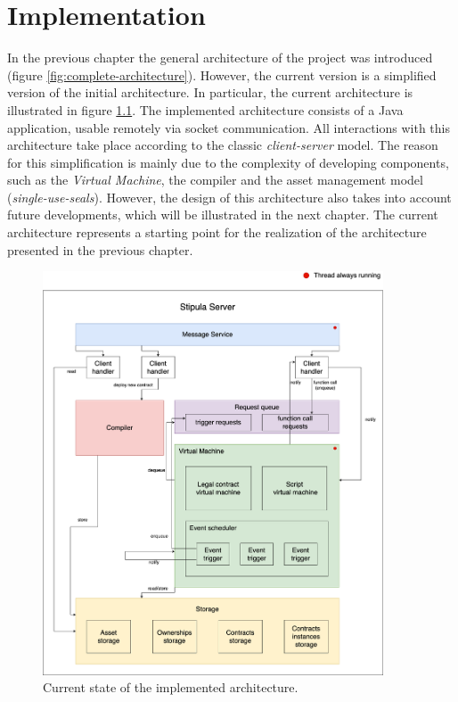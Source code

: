 
\chapter{Implementation}
\label{cap:implementation}

In the previous chapter the general architecture of the project was introduced (figure 
\ref{fig:complete-architecture}). However, the current version is a simplified version of the initial 
architecture. In particular, the current architecture is illustrated in figure 
\ref{fig:current-architecture}. The implemented architecture consists of a Java application, usable 
remotely via socket communication. All interactions with this architecture take place according to the 
classic \textit{client-server} model. The reason for this simplification is mainly due to the complexity 
of developing components, such as the \textit{Virtual Machine}, the compiler and the asset management 
model (\textit{single-use-seals}). However, the design of this architecture also takes into account future 
developments, which will be illustrated in the next chapter. The current architecture represents a 
starting point for the realization of the architecture presented in the previous chapter.

\begin{figure}[htbp]
	\begin{center}
		\includegraphics[width=0.9\textwidth]{immagini/capitolo-5/current-architecture.png}
		\caption{Current state of the implemented architecture.}
		\label{fig:current-architecture}
	\end{center}
\end{figure}


